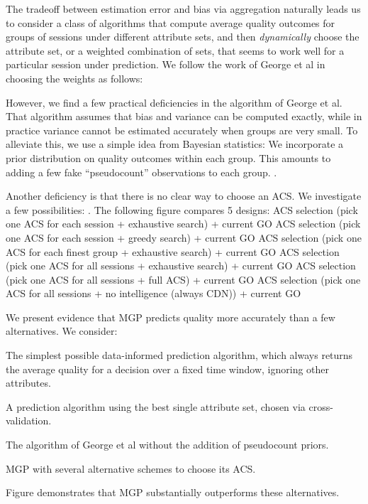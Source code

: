 \label{prediction}
The tradeoff between estimation error and bias via aggregation naturally leads us to consider a class of algorithms that compute average quality outcomes for groups of sessions under different attribute sets, and then {\it dynamically} choose the attribute set, or a weighted combination of sets, that seems to work well for a particular session under prediction.  We follow the work of George et al \cite{george2008value} in choosing the weights as follows:
\fillme

However, we find a few practical deficiencies in the algorithm of George et al.  That algorithm assumes that bias and variance can be computed exactly, while in practice variance cannot be estimated accurately when groups are very small.  To alleviate this, we use a simple idea from Bayesian statistics: We incorporate a prior distribution on quality outcomes within each group.  This amounts to adding a few fake ``pseudocount'' observations to each group.  \fillme.

Another deficiency is that there is no clear way to choose an ACS.  We investigate a few possibilities: \fillme . The following figure compares 5 designs:
ACS selection (pick one ACS for each session + exhaustive search) + current GO
ACS selection (pick one ACS for each session + greedy search) + current GO
ACS selection (pick one ACS for each finest group + exhaustive search) + current GO
ACS selection (pick one ACS for all sessions + exhaustive search) + current GO
ACS selection (pick one ACS for all sessions + full ACS) + current GO
ACS selection (pick one ACS for all sessions + no intelligence (always CDN)) + current GO

We present evidence that MGP predicts quality more accurately than a few alternatives.  We consider:
\begin{packedenumerate}
  \item The simplest possible data-informed prediction algorithm, which always returns the average quality for a decision over a fixed time window, ignoring other attributes.
  \item A prediction algorithm using the best single attribute set, chosen via cross-validation.
  \item The algorithm of George et al without the addition of pseudocount priors.
  \item MGP with several alternative schemes to choose its ACS.
\end{packedenumerate}
Figure \fillme demonstrates that MGP substantially outperforms these alternatives.

